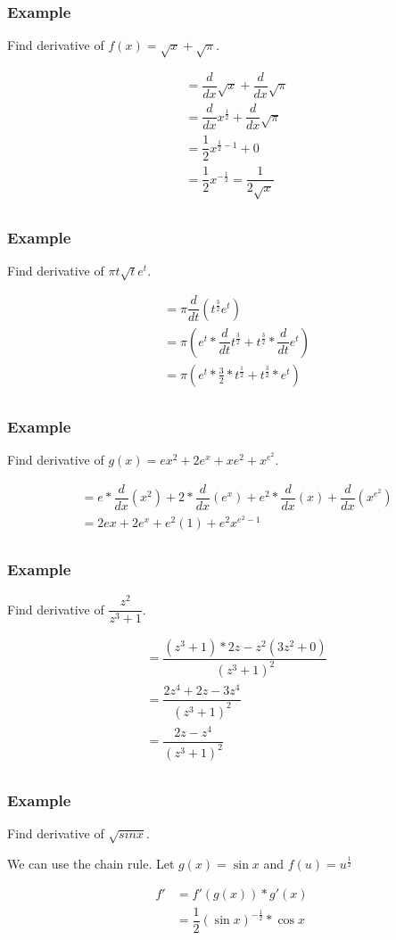 \documentclass[t]{beamer}
\theoremstyle{plain}
\theoremstyle{definition}
\begin{document}
\frame
{
	\frametitle{Example}
	Find derivative of $f(x)=\sqrt{x} + \sqrt{\pi}$. 
	
	\begin{align*}
  	&= \dfrac{d}{dx}\sqrt{x} + \dfrac{d}{dx}\sqrt{\pi} \\
  	&= \dfrac{d}{dx}x^{\frac{1}{2}} + \dfrac{d}{dx}\sqrt{\pi} \\
  	&= \dfrac{1}{2}x^{\frac{1}{2}-1} + 0\\
  	&= \dfrac{1}{2}x^{-\frac{1}{2}}  = \dfrac{1}{2\sqrt{x}}\\
	\end{align*}	
}

\frame
{
	\frametitle{Example}
	Find derivative of $\pi t \sqrt{t}e^t$. 
	
	\begin{align*}
  	&=\pi \dfrac{d}{dt} ( t^\frac{3}{2}e^t ) \\
  	&=\pi(e^t * \dfrac{d}{dt}t^\frac{3}{2} + t^\frac{3}{2} * \dfrac{d}{dt}e^t)\\
  	&=\pi(e^t * \frac{3}{2} * t^\frac{1}{2} + t^\frac{3}{2} * e^t)\\
	\end{align*}	
}

\frame
{
	\frametitle{Example}
	Find derivative of $g(x) = ex^2 + 2e^x + xe^2 + x^{e^2}$. 
	
	\begin{align*}
  	&=e* \dfrac{d}{dx}(x^2) + 2* \dfrac{d}{dx}(e^x) + e^2* \dfrac{d}{dx}(x) + \dfrac{d}{dx}(x^{e^2}) \\
  	&= 2ex + 2e^x + e^2(1) + e^2x^{e^2-1}\\
	\end{align*}	
}

\frame
{
	\frametitle{Example}
	Find derivative of $\dfrac{z^2}{z^3 + 1}$. 
	
	\begin{align*}
  	&=\dfrac{(z^3 + 1)*2z - z^2(3z^2 + 0)}{(z^3 + 1)^2} \\
  	&=\dfrac{2z^4 + 2z - 3z^4}{(z^3 + 1)^2} \\
  	&=\dfrac{2z - z^4}{(z^3 + 1)^2} \\
	\end{align*}	
}

\frame
{
	\frametitle{Example}
	Find derivative of $\sqrt{sin{x}}$. 
	
	\vspace{3em}

	We can use the chain rule.  Let $g(x) = \sin{x}$ and $f(u) = u^{\frac{1}{2}}$	
		
	\begin{align*}
  	f' &= f'(g(x)) * g'(x)\\
  	&= \dfrac{1}{2}(\sin{x})^{-\frac{1}{2}} * \cos{x}\\
	\end{align*}	
	
}
\end{document}
